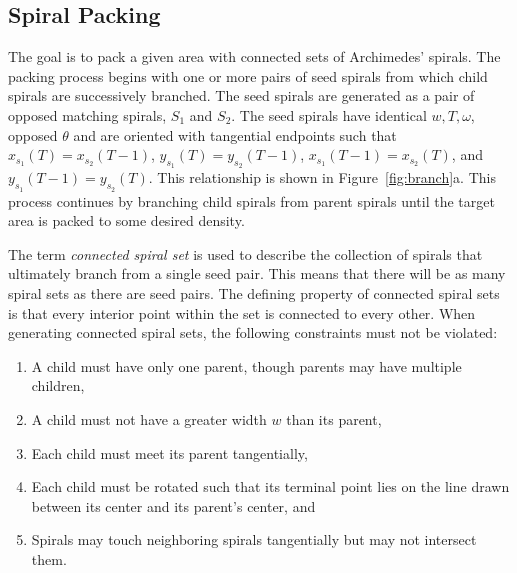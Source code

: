 \documentclass[11pt]{IEEEtran}
\begin{document}
\subsection{Spiral Packing}
The goal is to pack a given area with connected sets of Archimedes' spirals. The packing process begins with one or more pairs of seed spirals from which child spirals are successively branched. The seed spirals are generated as a pair of opposed matching spirals, \begin{math}S_{1}\end{math} and \begin{math}S_{2}\end{math}. The seed spirals have identical \begin{math} w, T, \omega \end{math}, opposed \begin{math}\theta\end{math} and are oriented with tangential endpoints such that \begin{math} x_{s_{1}}(T) = x_{s_{2}}(T-1) \end{math}, 
\begin{math} y_{s_{1}}(T) = y_{s_{2}}(T-1)\end{math}, 
\begin{math} x_{s_{1}}(T-1) = x_{s_{2}}(T)\end{math}, and 
\begin{math} y_{s_{1}}(T-1) = y_{s_{2}}(T) \end{math}. 
This relationship is shown in Figure~\ref{fig:branch}a. This process continues by branching child spirals from parent spirals until the target area is packed to some desired density. 

The term \textit{connected spiral set} is used to describe the collection of spirals that ultimately branch from a single seed pair. This means that there will be as many spiral sets as there are seed pairs. The defining property of connected spiral sets is that every interior point within the set is connected to every other. When generating connected spiral sets, the following constraints must not be violated:
\begin{enumerate}
  \item A child must have only one parent, though parents may have multiple children,
  \item A child must not have a greater width \begin{math}w\end{math} than its parent,
  \item Each child must meet its parent tangentially,
  \item Each child must be rotated such that its terminal point lies on the line drawn between its center and its parent's center, and
  \item Spirals may touch neighboring spirals tangentially but may not intersect them.
\end{enumerate}
\end{document}
